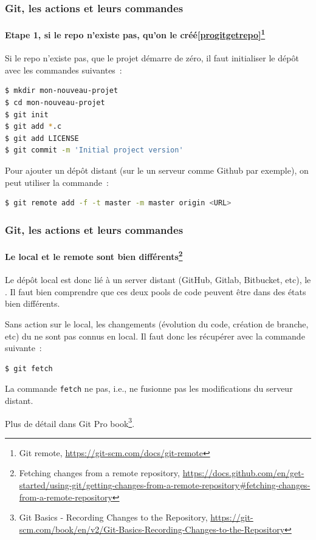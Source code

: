 \documentclass{beamer}
\begin{document}
    \begin{frame}[fragile]
        \frametitle{Git, les actions et leurs commandes}
        \framesubtitle{Etape 1, si le repo n'existe pas, qu'on le créé\cref{progitgetrepo}\footnote{Git remote, \url{https://git-scm.com/docs/git-remote}}}
        \transdissolve
        Si le repo n'existe pas, que le projet démarre de zéro, il faut initialiser le dépôt avec les commandes suivantes~:
        \begin{lstlisting}[language=sh]
$ mkdir mon-nouveau-projet
$ cd mon-nouveau-projet
$ git init
$ git add *.c
$ git add LICENSE
$ git commit -m 'Initial project version'
        \end{lstlisting}

        Pour ajouter un dépôt distant (sur le un serveur comme Github par exemple), on peut utiliser la commande~:
        \begin{lstlisting}[language=sh]
$ git remote add -f -t master -m master origin <URL>
        \end{lstlisting}
    \end{frame}

    \begin{frame}[fragile]
        \frametitle{Git, les actions et leurs commandes}
        \framesubtitle{Le local et le remote sont bien différents\footnote{\label{progitfetch}Fetching changes from a remote repository, \url{https://docs.github.com/en/get-started/using-git/getting-changes-from-a-remote-repository\#fetching-changes-from-a-remote-repository}}}
        \transdissolve
        Le dépôt local est donc lié à un server distant (GitHub, Gitlab, Bitbucket, etc), le .
        Il faut bien comprendre que ces deux pools de code peuvent être dans des états bien différents.

        Sans action sur le local, les changements (évolution du code, création de branche, etc) du  ne sont pas connus en local.
        Il faut donc les récupérer avec la commande suivante~:
        \begin{lstlisting}[language=sh]
$ git fetch
        \end{lstlisting}
        La commande \lstinline{fetch} ne  pas, i.e., ne fusionne pas les modifications du serveur distant.

        Plus de détail dans Git Pro book\footnote{Git Basics - Recording Changes to the Repository, \url{https://git-scm.com/book/en/v2/Git-Basics-Recording-Changes-to-the-Repository}}.

    \end{frame}
\end{document}
